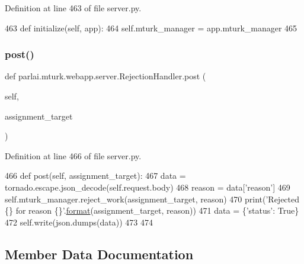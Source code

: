 Definition at line 463 of file server.\+py.


\begin{DoxyCode}
463     \textcolor{keyword}{def }initialize(self, app):
464         self.mturk\_manager = app.mturk\_manager
465 
\end{DoxyCode}
\mbox{\label{classparlai_1_1mturk_1_1webapp_1_1server_1_1RejectionHandler_ab53a292bed562b166bd63ef81ae38a43}} 
\subsubsection{\texorpdfstring{post()}{post()}}
{\footnotesize\ttfamily def parlai.\+mturk.\+webapp.\+server.\+Rejection\+Handler.\+post (\begin{DoxyParamCaption}\item[{}]{self,  }\item[{}]{assignment\+\_\+target }\end{DoxyParamCaption})}



Definition at line 466 of file server.\+py.


\begin{DoxyCode}
466     \textcolor{keyword}{def }post(self, assignment\_target):
467         data = tornado.escape.json\_decode(self.request.body)
468         reason = data[\textcolor{stringliteral}{'reason'}]
469         self.mturk\_manager.reject\_work(assignment\_target, reason)
470         print(\textcolor{stringliteral}{'Rejected \{\} for reason \{\}'}.\hyperlink{namespaceparlai_1_1chat__service_1_1services_1_1messenger_1_1shared__utils_a32e2e2022b824fbaf80c747160b52a76}{format}(assignment\_target, reason))
471         data = \{\textcolor{stringliteral}{'status'}: \textcolor{keyword}{True}\}
472         self.write(json.dumps(data))
473 
474 
\end{DoxyCode}


\subsection{Member Data Documentation}
\mbox{\label{classparlai_1_1mturk_1_1webapp_1_1server_1_1RejectionHandler_add298625ab3b54fd34cc774e7eeb9e7c}} 
